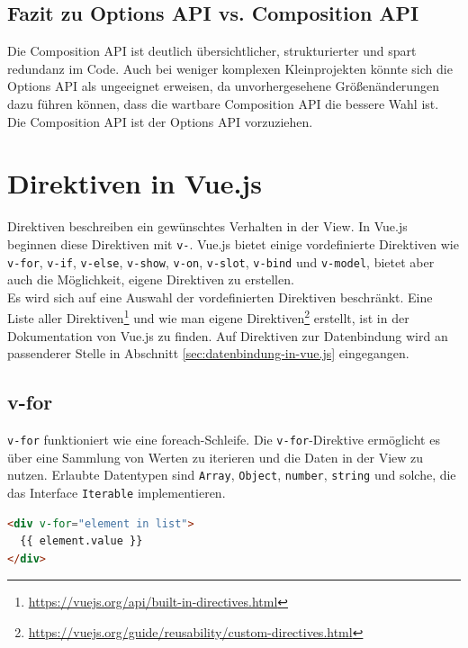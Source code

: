 \subsection*{Fazit zu Options API vs. Composition API}
Die Composition API ist deutlich übersichtlicher, strukturierter und spart redundanz im Code.
Auch bei weniger komplexen Kleinprojekten könnte sich die Options API als ungeeignet erweisen,
da unvorhergesehene Größenänderungen dazu führen können,
dass die wartbare Composition API die bessere Wahl ist.
Die Composition API ist der Options API vorzuziehen.


\section{Direktiven in Vue.js}\label{sec:direktiven-in-vue.js}
Direktiven beschreiben ein gewünschtes Verhalten in der View.
In Vue.js beginnen diese Direktiven mit \texttt{v-}.
Vue.js bietet einige vordefinierte Direktiven wie \texttt{v-for}, \texttt{v-if}, \texttt{v-else}, \texttt{v-show}, \texttt{v-on}, \texttt{v-slot}, \texttt{v-bind}
und \texttt{v-model}, bietet aber auch die Möglichkeit, eigene Direktiven zu erstellen. \cite[S. 10]{steyer2019}
\\
Es wird sich auf eine Auswahl der vordefinierten Direktiven beschränkt.
Eine Liste aller Direktiven\footnote{\url{https://vuejs.org/api/built-in-directives.html}}
und wie man eigene Direktiven\footnote{\url{https://vuejs.org/guide/reusability/custom-directives.html}}
erstellt, ist in der Dokumentation von Vue.js zu finden.
Auf Direktiven zur Datenbindung wird an passenderer Stelle in Abschnitt \ref{sec:datenbindung-in-vue.js} eingegangen.


\subsection*{v-for}
\texttt{v-for} funktioniert wie eine foreach-Schleife.
Die \texttt{v-for}-Direktive ermöglicht es über eine Sammlung von Werten zu iterieren und die Daten in der View zu nutzen.
Erlaubte Datentypen sind \texttt{Array}, \texttt{Object}, \texttt{number}, \texttt{string} und solche, die das Interface \texttt{Iterable} implementieren. \cite{vueDirectives}
\begin{lstlisting}[caption={\texttt{v-for}-Direktive},language=html, label={lst:v-for}]
<div v-for="element in list">
  {{ element.value }}
</div>
\end{lstlisting}


